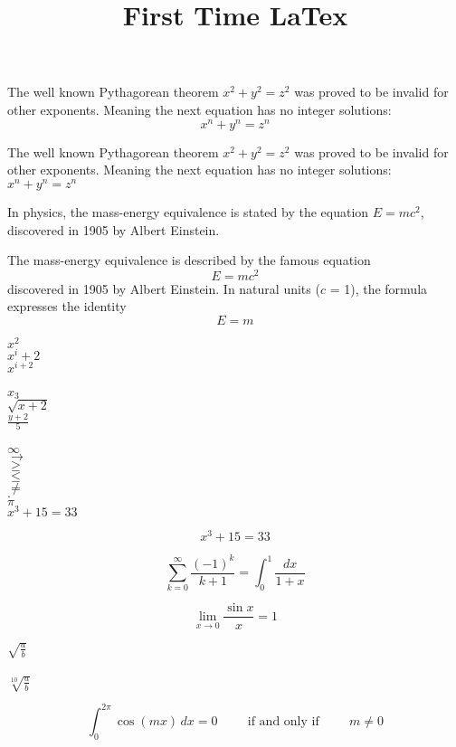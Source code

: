 \documentclass{article}
\title{First Time LaTex}
\begin{document}
The well known Pythagorean theorem \(x^2 + y^2 = z^2\) was proved to be invalid for other exponents. Meaning the next equation has no integer solutions:   \[ x^n + y^n = z^n \]

The well known Pythagorean theorem \(x^2 + y^2 = z^2\) was proved to be invalid for other exponents. Meaning the next equation has no integer solutions:   \( x^n + y^n = z^n \) 

In physics, the mass-energy equivalence is stated by the equation $E=mc^2$, discovered in 1905 by Albert Einstein.

The mass-energy equivalence is described by the famous equation   $$E=mc^2$$   discovered in 1905 by Albert Einstein. In natural units ($c$ = 1), the formula expresses the identity   \begin{equation} E=m \end{equation}


$x^2$\\
$x^i+2$\\
$x^{i+2}$\\
\\
$x_3$\\
$\sqrt{x+2}$\\
$\frac{y+2}{5}$\\
\\
$\infty$\\
$\to$\\
$\geq$\\
$\leq$\\
$\neq$\\
$\cdot$\\
$\pi$\\
$x^3+15=33$

\[x^3+15=33\]


$$
\sum_{k=0}^\infty\frac{(-1)^k}{k+1} = \int_0^1\frac{dx}{1+x}
$$

$$
\lim_{x\rightarrow 0} \frac{\sin x}{x} = 1
$$

$\sqrt{\frac{a}{b}}$ \\\\


$\sqrt[10]{\frac{a}{b}}$

$$
\int_0^{2\pi}\cos(mx)\,dx = 0 \hspace{1cm}
\mbox{if and only if} \hspace{1cm} m\ne 0
$$
\end{document}
